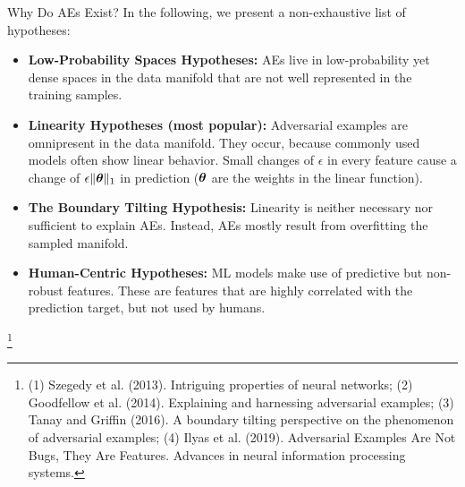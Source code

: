 \documentclass[11pt,compress,t,notes=noshow, xcolor=table]{beamer}
\begin{document}
\begin{vbframe}{Why Do AEs Exist?}
In the following, we present a non-exhaustive list of hypotheses:
\begin{itemize}
    \item \textbf{Low-Probability Spaces Hypotheses:} AEs live in low-probability yet dense spaces in the data manifold that are not well represented in the training samples.
    \item \textbf{Linearity Hypotheses (most popular):} Adversarial examples are omnipresent in the data manifold. They occur, because commonly used models often show linear behavior. Small changes of $\epsilon$ in every feature cause a change of $\epsilon\|\thetab\|_1$ in prediction ($\thetab$ are the weights in the linear function).
    \item \textbf{The Boundary Tilting Hypothesis:} Linearity is neither necessary nor sufficient to explain AEs. Instead, AEs mostly result from overfitting the sampled manifold.
    \item \textbf{Human-Centric Hypotheses:} ML models make use of predictive but non-robust features. These are features that are highly correlated with the prediction target, but not used by humans.
\end{itemize}
\vspace{-0.2cm}
\footnote[frame]{(1) Szegedy et al. (2013). Intriguing properties of neural networks; (2) Goodfellow et al. (2014). Explaining and harnessing adversarial examples; (3) Tanay and Griffin (2016). A boundary tilting perspective on the phenomenon of adversarial examples; (4) Ilyas et al. (2019). Adversarial Examples Are Not Bugs, They Are Features. Advances in neural information processing systems.}
\end{vbframe}
\end{document}
